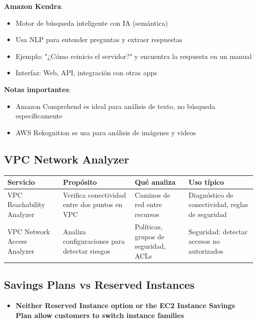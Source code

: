 \documentclass[12pt,a4paper]{report}
\newcommand{\important}[1]{\textcolor{dangerred}{\textbf{#1}}}
\begin{document}
\textbf{Amazon Kendra}:
\begin{itemize}
    \item Motor de búsqueda inteligente con IA (semántica)
    \item Usa NLP para entender preguntas y extraer respuestas
    \item Ejemplo: "¿Cómo reinicio el servidor?" y encuentra la respuesta en un manual
    \item Interfaz: Web, API, integración con otras apps
\end{itemize}

\textbf{Notas importantes}:
\begin{itemize}
    \item Amazon Comprehend es ideal para análisis de texto, no búsqueda específicamente
    \item AWS Rekognition se usa para análisis de imágenes y videos
\end{itemize}

\subsection{VPC Network Analyzer}

\begin{center}
\begin{longtable}{|p{3.5cm}|p{5cm}|p{4cm}|p{3cm}|}
\hline
\cellcolor{awsblue!20}\textbf{Servicio} & \cellcolor{awsblue!20}\textbf{Propósito} & \cellcolor{awsblue!20}\textbf{Qué analiza} & \cellcolor{awsblue!20}\textbf{Uso típico} \\
\hline
VPC Reachability Analyzer & Verifica conectividad entre dos puntos en VPC & Caminos de red entre recursos & Diagnóstico de conectividad, reglas de seguridad \\
\hline
VPC Network Access Analyzer & Analiza configuraciones para detectar riesgos & Políticas, grupos de seguridad, ACLs & Seguridad: detectar accesos no autorizados \\
\hline
\end{longtable}
\end{center}

\subsection{Savings Plans vs Reserved Instances}

\begin{itemize}
    \item \important{Neither Reserved Instance option or the EC2 Instance Savings Plan allow customers to switch instance families}
\end{itemize}
\end{document}
